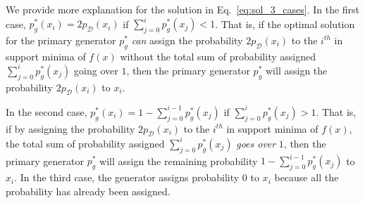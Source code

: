 We provide more explanation for the solution in Eq.~\ref{eq:sol_3_cases}. 
In the first case, $p^*_{g} (x_i) = 2p_{\mathcal{D}} (x_i)$ if $\sum_{j=0}^i p^*_g(x_j) < 1$. 
That is, if the optimal solution for the primary generator $p^*_{g}$ \textit{can} assign the probability $2p_{\mathcal{D}} (x_i)$ to the $i^{th}$ in support minima of $f(x)$ without the total sum of probability assigned $\sum_{j=0}^i p^*_g(x_j)$ going over $1$, then the primary generator $p^*_{g}$ will assign the probability $2p_{\mathcal{D}} (x_i)$ to $x_i$. 

In the second case, $p^*_{g} (x_i) = 1 -  \sum_{j=0}^{i-1} p^*_g(x_j)$ if $\sum_{j=0}^i p^*_g(x_j) > 1$. That is, if by assigning the probability $2p_{\mathcal{D}} (x_i)$ to the $i^{th}$ in support minima of $f(x)$, the total sum of probability assigned $\sum_{j=0}^i p^*_g(x_j)$ \textit{goes over} $1$, then the primary generator $p^*_{g}$ will assign the remaining probability $1 -  \sum_{j=0}^{i-1} p^*_g(x_j)$ to $x_i$. In the third case, the generator assigns probability $0$ to $x_i$ because all the probability has already been assigned. 

